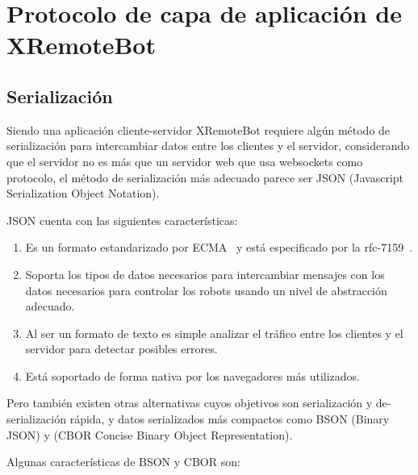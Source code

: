 
\chapter{Protocolo de capa de aplicación de XRemoteBot}\label{cha:protocolo}


\section{Serialización}
Siendo una aplicación cliente-servidor XRemoteBot requiere algún método de
serialización para intercambiar datos entre los clientes y el servidor,
considerando que el servidor no es más que un servidor web que usa websockets
como protocolo, el método de serialización más adecuado parece ser JSON
(Javascript Serialization Object Notation).

JSON cuenta con las siguientes características:

\begin{enumerate}
    \item Es un formato estandarizado por ECMA~\citep{ecma-404}
        y está especificado por la rfc-7159~\citep{rfc-7159}.
    \item Soporta los tipos de datos necesarios para intercambiar mensajes con
        los datos necesarios para controlar los robots usando un nivel de
        abstracción adecuado.
    \item Al ser un formato de texto es simple analizar el tráfico entre los
        clientes y el servidor para detectar posibles errores.
    \item Está soportado de forma nativa por los navegadores más
        utilizados.%
\end{enumerate}

Pero también existen otras alternativas cuyos objetivos son serialización
y de-serialización rápida, y datos serializados más compactos
como BSON (Binary JSON) y (CBOR Concise Binary Object Representation).

Algunas características de BSON y CBOR son:

